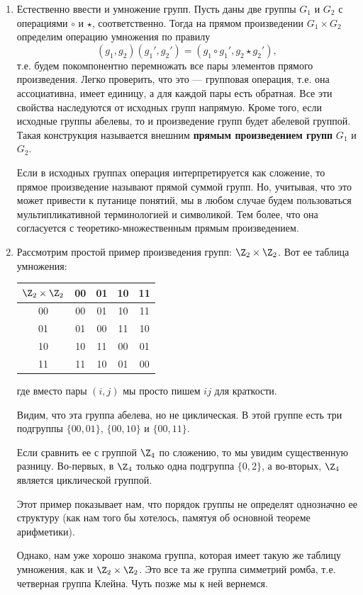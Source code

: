 \begin{enumerate}
\item Естественно ввести и умножение групп. Пусть даны две группы $G_1$ и $G_2$ с операциями $\circ$ и $\star$, соответственно. Тогда на прямом произведении $G_1\times G_2$ определим операцию умножения по правилу
$$
(g_1,g_2)(g_1',g_2') = (g_1\circ g_1', g_2\star g_2'),
$$
т.е. будем покомпонентно перемножать все пары элементов прямого произведения. Легко проверить, что это --- групповая операция, т.е. она ассоциативна, имеет единицу, а для каждой пары есть обратная. Все эти свойства наследуются от исходных групп напрямую. Кроме того, если исходные группы абелевы, то и произведение групп будет абелевой группой. Такая конструкция называется внешним \textbf{прямым произведением групп} $G_1$ и $G_2$.

Если в исходных группах операция интерпретируется как сложение, то прямое произведение называют прямой суммой групп. Но, учитывая, что это может привести к путанице понятий, мы в любом случае будем пользоваться мультипликативной терминологией и символикой. Тем более, что она согласуется с теоретико-множественным прямым произведением.

\item Рассмотрим простой пример произведения групп: $\Z_2\times\Z_2$. Вот ее таблица умножения:

\begin{center}
\begin{tabular}{c|cccc}
$\Z_2\times\Z_2$ & 00 & 01 & 10 & 11\\  \hline
00 & 00 & 01 & 10 & 11 \\
01 & 01 & 00 & 11 & 10 \\
10 & 10 & 11 & 00 & 01 \\
11 & 11 & 10 & 01 & 00
\end{tabular}
\end{center}
где вместо пары $(i,j)$ мы просто пишем $ij$ для краткости.

Видим, что эта группа абелева, но не циклическая. В этой группе есть три подгруппы $\{00,01\}$, $\{00,10\}$ и $\{00,11\}$.

Если сравнить ее с группой $\Z_4$ по сложению, то мы увидим существенную разницу. Во-первых, в $\Z_4$ только одна подгруппа $\{0,2\}$, а во-вторых, $\Z_4$ является циклической группой.

Этот пример показывает нам, что порядок группы не определят однозначно ее структуру (как нам того бы хотелось, памятуя об основной теореме арифметики).

Однако, нам уже хорошо знакома группа, которая имеет такую же таблицу умножения, как и $\Z_2\times\Z_2$. Это все та же группа симметрий ромба, т.е. четверная группа Клейна. Чуть позже мы к ней вернемся.


\end{enumerate}

